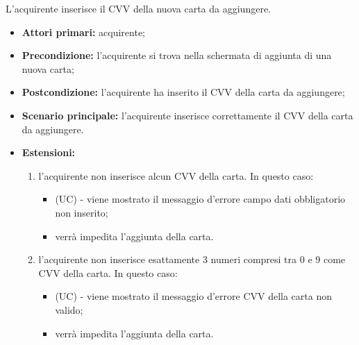 L'acquirente inserisce il CVV della nuova carta da aggiungere.
\begin{itemize}
    \item \textbf{Attori primari:} acquirente;
    \item \textbf{Precondizione:} l'acquirente si trova nella schermata di aggiunta di una nuova carta;
    \item \textbf{Postcondizione:} l'acquirente ha inserito il CVV della carta da aggiungere;
    \item \textbf{Scenario principale:} l'acquirente inserisce correttamente il CVV della carta da aggiungere.
    \item \textbf{Estensioni:}
    \begin{enumerate}[label=\lett]
        \item l'acquirente non inserisce alcun CVV della carta. In questo caso:
        \begin{itemize}
            \item (UC) - viene mostrato il messaggio d'errore campo dati obbligatorio non inserito;
            \item verrà impedita l'aggiunta della carta.
        \end{itemize}
        \item l'acquirente non inserisce esattamente 3 numeri compresi tra 0 e 9 come CVV della carta. In questo caso:
        \begin{itemize}
            \item (UC) - viene mostrato il messaggio d'errore CVV della carta non valido;
            \item verrà impedita l'aggiunta della carta.
        \end{itemize}
    \end{enumerate}
\end{itemize}

